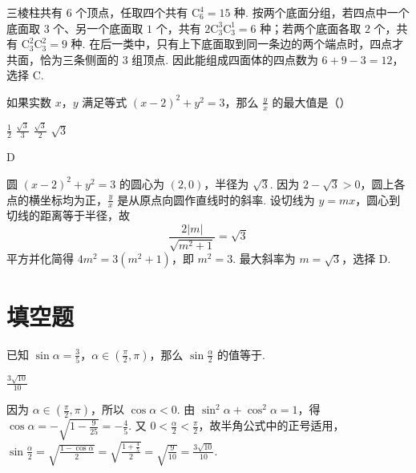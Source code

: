 \documentclass[UTF8,a4paper,oneside,11pt]{ctexbook}
\begin{document}
\begin{solution}
三棱柱共有 \(6\) 个顶点，任取四个共有 \(\mathrm C_6^4=15\) 种. 按两个底面分组，若四点中一个底面取 \(3\) 个、另一个底面取 \(1\) 个，共有 \(2\mathrm C_3^3\mathrm C_3^1=6\) 种；若两个底面各取 \(2\) 个，共有 \(\mathrm C_3^2\mathrm C_3^2=9\) 种. 在后一类中，只有上下底面取到同一条边的两个端点时，四点才共面，恰为三条侧面的 \(3\) 组顶点. 因此能组成四面体的四点数为 \(6+9-3=12\)，选择 C.
\end{solution}

\begin{problem}
如果实数 \(x\)，\(y\) 满足等式 \((x-2)^2+y^2=3\)，那么 \(\frac{y}{x}\) 的最大值是（\quad）

\choices
    {\(\frac{1}{2}\)}
    {\(\frac{\sqrt{3}}{3}\)}
    {\(\frac{\sqrt{3}}{2}\)}
    {\(\sqrt{3}\)}
\end{problem}

\begin{answer}
D
\end{answer}

\begin{solution}
圆 \((x-2)^2+y^2=3\) 的圆心为 \((2,0)\)，半径为 \(\sqrt3\). 因为 \(2-\sqrt3>0\)，圆上各点的横坐标均为正，\(\frac{y}{x}\) 是从原点向圆作直线时的斜率. 设切线为 \(y=mx\)，圆心到切线的距离等于半径，故
\[
\frac{2|m|}{\sqrt{m^2+1}}=\sqrt3
\]
平方并化简得 \(4m^2=3(m^2+1)\)，即 \(m^2=3\). 最大斜率为 \(m=\sqrt3\)，选择 D.
\end{solution}

\section{填空题}

\begin{problem}
已知 \(\sin\alpha=\frac{3}{5}\)，\(\alpha\in\left( \frac{\pi}{2},\pi \right)\)，那么 \(\sin \frac{\alpha}{2}\) 的值等于\fillinblank{}.
\end{problem}

\begin{answer}
\(\frac{3\sqrt{10}}{10}\)
\end{answer}

\begin{solution}
因为 \(\alpha\in\left(\frac{\pi}{2},\pi\right)\)，所以 \(\cos\alpha<0\). 由 \(\sin^2\alpha+\cos^2\alpha=1\)，得 \(\cos\alpha=-\sqrt{1-\frac{9}{25}}=-\frac45\). 又 \(0<\frac\alpha2<\frac\pi2\)，故半角公式中的正号适用，\(\sin\frac\alpha2=\sqrt{\frac{1-\cos\alpha}{2}}=\sqrt{\frac{1+\frac45}{2}}=\sqrt{\frac9{10}}=\frac{3\sqrt{10}}{10}\).
\end{solution}
\end{document}
